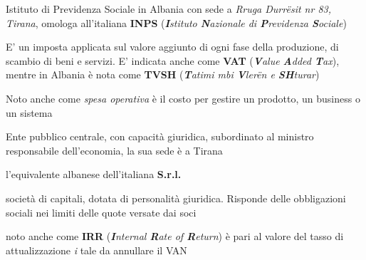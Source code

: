 \begin{acronym}
\begin{multicols}{2}
		   {\newline \small Istituto di Previdenza Sociale in Albania con sede a \textit{Rruga Durr\"esit nr 83, Tirana}\cite{issh_albania}, omologa all'italiana \textbf{INPS} (\textit{\textbf{I}stituto \textbf{N}azionale di \textbf{P}revidenza \textbf{S}ociale})\cite{inps_italia}\par}

		   {\newline \small E' un imposta applicata sul valore aggiunto di ogni fase della produzione, di scambio di beni e servizi. E' indicata anche come \textbf{VAT} (\textit{\textbf{V}alue \textbf{A}dded \textbf{T}ax}), mentre in Albania è nota come \textbf{TVSH} (\textit{\textbf{T}atimi mbi \textbf{V}ler\"en e \textbf{SH}turar}) \par}

		   {\newline \small Noto anche come \textit{spesa operativa} è il costo per gestire un prodotto, un business o un sistema \par}

		   {\newline \small Ente pubblico centrale, con capacità giuridica, subordinato al ministro responsabile dell'economia, la sua sede è a Tirana\par}

		   {\newline \small l'equivalente albanese dell'italiana \textbf{\ac{S.r.l.}}\par}

		   {\newline \small società di capitali, dotata di personalità giuridica. Risponde delle obbligazioni sociali nei limiti delle quote versate dai soci\par}

		   {\newline \small noto anche come \textbf{IRR} (\textit{\textbf{I}nternal \textbf{R}ate of \textbf{R}eturn}) è pari al valore del tasso di attualizzazione \textit{i} tale da annullare il \ac{VAN} \par}		   


\end{multicols}
\end{acronym}

